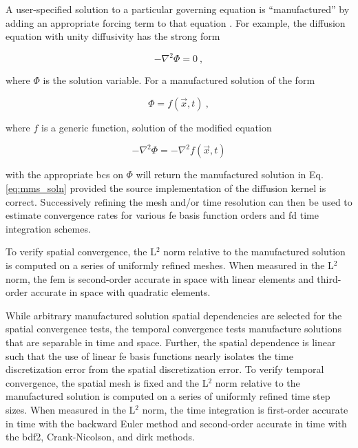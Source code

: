A user-specified solution to a particular governing equation is ``manufactured'' by adding an appropriate forcing term to that equation \cite{roache}. For example, the diffusion equation with unity diffusivity has the strong form

\begin{equation}
\label{eq:diff_example}
-\nabla^2\Phi=0\ ,
\end{equation}
 
\noindent where \(\Phi\) is the solution variable. For a manufactured solution of the form

\begin{equation}
\label{eq:mms_soln}
\Phi=f(\vec{x},t)\ ,
\end{equation}

\noindent where \(f\) is a generic function, solution of the modified equation

\begin{equation}
-\nabla^2\Phi=-\nabla^2f(\vec{x},t)
\end{equation}

\noindent with the appropriate \glspl{bc} on \(\Phi\) will return the manufactured solution in Eq. \eqref{eq:mms_soln} provided the source implementation of the diffusion kernel is correct. Successively refining the mesh and/or time resolution can then be used to estimate convergence rates for various \gls{fe} basis function orders and \gls{fd} time integration schemes.

To verify spatial convergence, the L$^2$ norm relative to the manufactured solution is computed on a series of uniformly refined meshes. When measured in the L$^2$ norm, the \gls{fem} is second-order accurate in space with linear elements and third-order accurate in space with quadratic elements. 

While arbitrary manufactured solution spatial dependencies are selected for the spatial convergence tests, the temporal convergence tests manufacture solutions that are separable in time and space. Further, the spatial dependence is linear such that the use of linear \gls{fe} basis functions nearly isolates the time discretization error from the spatial discretization error. To verify temporal convergence, the spatial mesh is fixed and the L$^2$ norm relative to the manufactured solution is computed on a series of uniformly refined time step sizes. When measured in the L$^2$ norm, the time integration is first-order accurate in time with the backward Euler method and second-order accurate in time with the \gls{bdf2}, Crank-Nicolson, and \gls{dirk} methods. 

